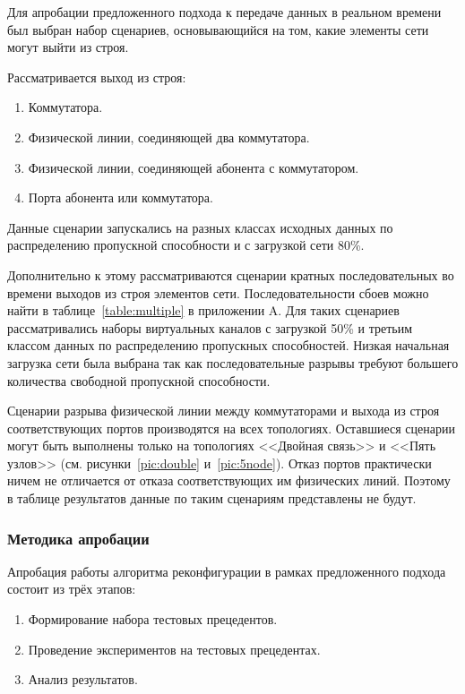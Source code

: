 \documentclass[12pt, a4paper]{article}
\begin{document}
Для апробации предложенного подхода к передаче данных в реальном времени был выбран набор сценариев, основывающийся на том, какие элементы сети могут выйти из строя. 

Рассматривается выход из строя:
\begin{enumerate}
	\item Коммутатора.
	\item Физической линии, соединяющей два коммутатора.
	\item Физической линии, соединяющей абонента с коммутатором.
	\item Порта абонента или коммутатора.
\end{enumerate}

Данные сценарии запускались на разных классах исходных данных по распределению пропускной способности и с загрузкой сети 80\%. 

Дополнительно к этому рассматриваются сценарии кратных последовательных во времени выходов из строя элементов сети. Последовательности сбоев можно найти в таблице~\ref{table:multiple} в приложении A. Для таких сценариев рассматривались наборы виртуальных каналов с загрузкой 50\% и третьим классом данных по распределению пропускных способностей. Низкая начальная загрузка сети была выбрана так как последовательные разрывы требуют большего количества свободной пропускной способности.  

Сценарии разрыва физической линии между коммутаторами и выхода из строя соответствующих портов производятся на всех топологиях. Оставшиеся сценарии могут быть выполнены только на топологиях <<Двойная связь>> и <<Пять узлов>> (см. рисунки~\ref{pic:double} и~\ref{pic:5node}). Отказ портов практически ничем не отличается от отказа соответствующих им физических линий. Поэтому в таблице результатов данные по таким сценариям представлены не будут.

\subsubsection{Методика апробации}
Апробация работы алгоритма реконфигурации в рамках предложенного подхода состоит из трёх этапов:
\begin{enumerate}
	\item Формирование набора тестовых прецедентов.
	\item Проведение экспериментов на тестовых прецедентах.
	\item Анализ результатов.
\end{enumerate}
\end{document}
